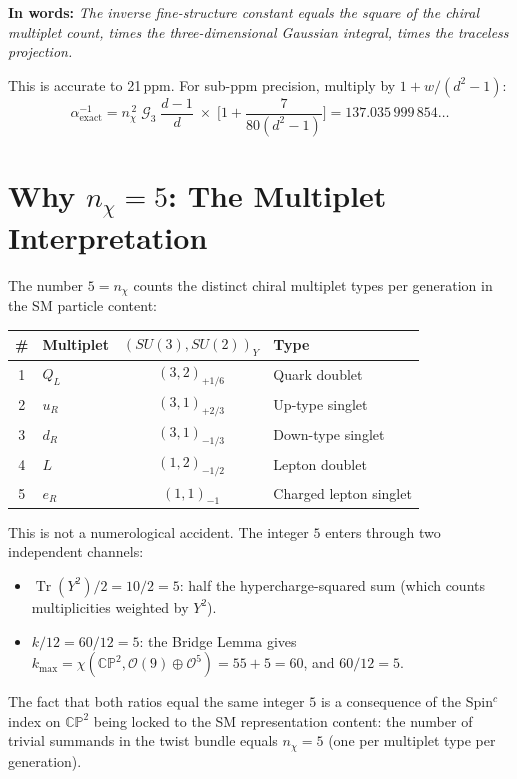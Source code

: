 \documentclass[11pt]{article}
\newcommand{\Tr}{\operatorname{Tr}}
\newcommand{\CP}{\mathbb{CP}}
\newcommand{\nchi}{n_{\!\chi}}
\begin{document}
\bigskip\noindent
\textbf{In words:} \emph{The inverse fine-structure constant equals the square
of the chiral multiplet count, times the three-dimensional Gaussian integral,
times the traceless projection.}

\bigskip\noindent
This is accurate to 21\,ppm.  For sub-ppm precision, multiply by
$1 + w/(d^2-1)$:
\begin{equation}
\alpha^{-1}_{\mathrm{exact}}
= \nchi^{\,2}\;\mathcal{G}_3\;\frac{d-1}{d}
\;\times\;
\biggl[1 + \frac{7}{80(d^2-1)}\biggr]
= 137.035\,999\,854\ldots
\label{eq:exact-correction}
\end{equation}


\section{Why $\nchi = 5$: The Multiplet Interpretation}
\label{sec:multiplet}

The number $5 = \nchi$ counts the distinct chiral multiplet types per
generation in the SM particle content:

\begin{center}
\begin{tabular}{@{}clcl@{}}
\toprule
\# & \textbf{Multiplet} & $(SU(3), SU(2))_Y$ & \textbf{Type} \\
\midrule
1 & $Q_L$   & $(3,2)_{+1/6}$ & Quark doublet \\
2 & $u_R$   & $(3,1)_{+2/3}$ & Up-type singlet \\
3 & $d_R$   & $(3,1)_{-1/3}$ & Down-type singlet \\
4 & $L$     & $(1,2)_{-1/2}$ & Lepton doublet \\
5 & $e_R$   & $(1,1)_{-1}$   & Charged lepton singlet \\
\bottomrule
\end{tabular}
\end{center}

\noindent
This is not a numerological accident.  The integer $5$ enters through two
independent channels:
\begin{itemize}
\item $\Tr(Y^2)/2 = 10/2 = 5$: half the hypercharge-squared sum
      (which counts multiplicities weighted by $Y^2$).
\item $k/12 = 60/12 = 5$: the Bridge Lemma gives
      $k_{\max} = \chi(\CP^2, \mathcal{O}(9) \oplus \mathcal{O}^5)
      = 55 + 5 = 60$, and $60/12 = 5$.
\end{itemize}
The fact that both ratios equal the same integer $5$ is a consequence of the
Spin$^c$ index on $\CP^2$ being locked to the SM representation content:
the number of trivial summands in the twist bundle equals $\nchi = 5$
(one per multiplet type per generation).
\end{document}
